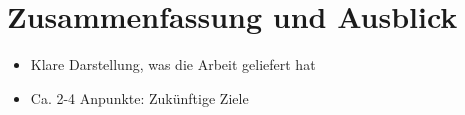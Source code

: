 \chapter{Zusammenfassung und Ausblick}

\begin{itemize}
	\item Klare Darstellung, was die Arbeit geliefert hat
	\item Ca. 2-4 Anpunkte: Zukünftige Ziele 
\end{itemize}
